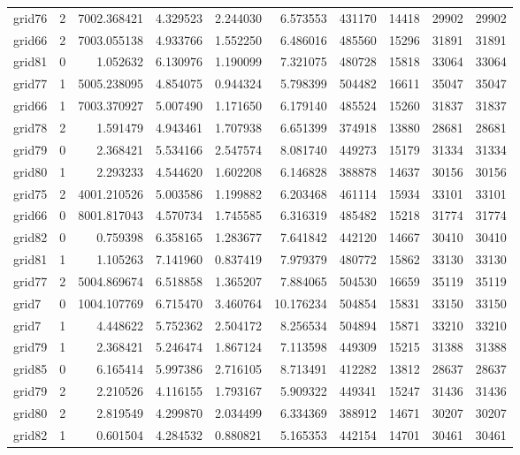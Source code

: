 \begin{longtable}{|l|r|r|r|r|r|r|r|r|r|}
grid76 & 2 & 7002.368421 & 4.329523 & 2.244030 & 6.573553 & 431170 & 14418 & 29902 & 29902 \\
grid66 & 2 & 7003.055138 & 4.933766 & 1.552250 & 6.486016 & 485560 & 15296 & 31891 & 31891 \\
grid81 & 0 & 1.052632 & 6.130976 & 1.190099 & 7.321075 & 480728 & 15818 & 33064 & 33064 \\
grid77 & 1 & 5005.238095 & 4.854075 & 0.944324 & 5.798399 & 504482 & 16611 & 35047 & 35047 \\
grid66 & 1 & 7003.370927 & 5.007490 & 1.171650 & 6.179140 & 485524 & 15260 & 31837 & 31837 \\
grid78 & 2 & 1.591479 & 4.943461 & 1.707938 & 6.651399 & 374918 & 13880 & 28681 & 28681 \\
grid79 & 0 & 2.368421 & 5.534166 & 2.547574 & 8.081740 & 449273 & 15179 & 31334 & 31334 \\
grid80 & 1 & 2.293233 & 4.544620 & 1.602208 & 6.146828 & 388878 & 14637 & 30156 & 30156 \\
grid75 & 2 & 4001.210526 & 5.003586 & 1.199882 & 6.203468 & 461114 & 15934 & 33101 & 33101 \\
grid66 & 0 & 8001.817043 & 4.570734 & 1.745585 & 6.316319 & 485482 & 15218 & 31774 & 31774 \\
grid82 & 0 & 0.759398 & 6.358165 & 1.283677 & 7.641842 & 442120 & 14667 & 30410 & 30410 \\
grid81 & 1 & 1.105263 & 7.141960 & 0.837419 & 7.979379 & 480772 & 15862 & 33130 & 33130 \\
grid77 & 2 & 5004.869674 & 6.518858 & 1.365207 & 7.884065 & 504530 & 16659 & 35119 & 35119 \\
grid7 & 0 & 1004.107769 & 6.715470 & 3.460764 & 10.176234 & 504854 & 15831 & 33150 & 33150 \\
grid7 & 1 & 4.448622 & 5.752362 & 2.504172 & 8.256534 & 504894 & 15871 & 33210 & 33210 \\
grid79 & 1 & 2.368421 & 5.246474 & 1.867124 & 7.113598 & 449309 & 15215 & 31388 & 31388 \\
grid85 & 0 & 6.165414 & 5.997386 & 2.716105 & 8.713491 & 412282 & 13812 & 28637 & 28637 \\
grid79 & 2 & 2.210526 & 4.116155 & 1.793167 & 5.909322 & 449341 & 15247 & 31436 & 31436 \\
grid80 & 2 & 2.819549 & 4.299870 & 2.034499 & 6.334369 & 388912 & 14671 & 30207 & 30207 \\
grid82 & 1 & 0.601504 & 4.284532 & 0.880821 & 5.165353 & 442154 & 14701 & 30461 & 30461 \\

\end{longtable}
